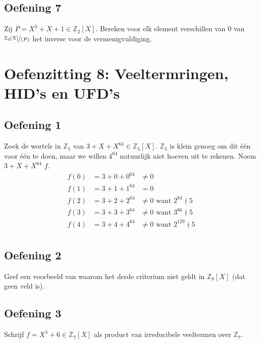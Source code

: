 \documentclass[main.tex]{subfiles}
\begin{document}
\subsection*{Oefening 7}
Zij $P=X^{3}+X+1 \in \mathbb{Z}_{2}[X]$.
Bereken voor elk element verschillen van $0$ van $\nicefrac{\mathbb{Z}_{2}[X]}{(P)}$ het inverse voor de vermenigvuldiging.

\section{Oefenzitting 8: Veeltermringen, HID's en UFD's}

\subsection*{Oefening 1}
Zoek de wortels in $\mathbb{Z}_{5}$ van $3+X+X^{64}\in \mathbb{Z}_{5}[X]$.
$\mathbb{Z}_{5}$ is klein genoeg om dit \'e\'en voor \'e\'en te doen, maar we willen $4^{64}$ natuurlijk niet hoeven uit te rekenen.
Noem $3+X+X^{64}$ $f$.
\[
\begin{array}{rll}
  f(0) &= 3 + 0 + 0^{64} &\neq 0\\
  f(1) &= 3 + 1 + 1^{64} &= 0\\
  f(2) &= 3 + 2 + 2^{64} &\neq 0 \text{ want } 2^{64} \nmid 5\\
  f(3) &= 3 + 3 + 3^{64} &\neq 0 \text{ want } 3^{66} \nmid 5\\
  f(4) &= 3 + 4 + 4^{64} &\neq 0 \text{ want } 2^{129} \nmid 5\\
\end{array}
\]
 
\subsection*{Oefening 2}
Geef een voorbeeld van waarom het derde criterium niet geldt in $\mathbb{Z}_{8}[X]$ (dat geen veld is).

\subsection*{Oefening 3}
Schrijf $f=X^{3}+6\in \mathbb{Z}_{7}[X]$ als product van irreducibele veeltermen over $\mathbb{Z}_{7}$.
\end{document}
